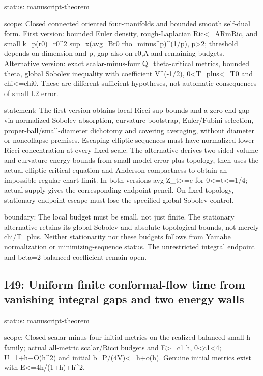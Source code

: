 \documentclass[
  10pt,
]{article}
\begin{document}
status: manuscript-theorem

scope: Closed connected oriented four-manifolds and bounded smooth
self-dual form. First version: bounded Euler density,
\textbar rough-Laplacian
Ric\textbar\textless=A\textbar Rm\textbar\textbar Ric\textbar, and small
k\_p(r0)=r0\^{}2 sup\_x(avg\_Br0 rho\_minus\^{}p)\^{}(1/p),
p\textgreater2; threshold depends on dimension and p, gap also on r0,A
and remaining budgets. Alternative version: exact scalar-minus-four
Q\_theta-critical metrics, bounded theta, global Sobolev inequality with
coefficient V\^{}(-1/2), 0\textless T\_plus\textless=T0 and
chi\textless=chi0. These are different sufficient hypotheses, not
automatic consequences of small L2 error.

statement: The first version obtains local Ricci sup bounds and a
zero-end gap via normalized Sobolev absorption, curvature bootstrap,
Euler/Fubini selection, proper-ball/small-diameter dichotomy and
covering averaging, without diameter or noncollapse premises. Escaping
elliptic sequences must have normalized lower-Ricci concentration at
every fixed scale. The alternative derives two-sided volume and
curvature-energy bounds from small model error plus topology, then uses
the actual elliptic critical equation and Anderson compactness to obtain
an impossible regular-chart limit. In both versions avg
Z\_t\textgreater=c for 0\textless=t\textless=1/4; actual supply gives
the corresponding endpoint pencil. On fixed topology, stationary
endpoint escape must lose the specified global Sobolev control.

boundary: The local budget must be small, not just finite. The
stationary alternative retains its global Sobolev and absolute
topological bounds, not merely chi/T\_plus. Neither stationarity nor
these budgets follows from Yamabe normalization or minimizing-sequence
status. The unrestricted integral endpoint and beta=2 balanced
coefficient remain open.

\hypertarget{i49-uniform-finite-conformal-flow-time-from-vanishing-integral-gaps-and-two-energy-walls}{%
\subsection{I49: Uniform finite conformal-flow time from vanishing
integral gaps and two energy
walls}\label{i49-uniform-finite-conformal-flow-time-from-vanishing-integral-gaps-and-two-energy-walls}}

status: manuscript-theorem

scope: Closed scalar-minus-four initial metrics on the realized balanced
small-h family; actual all-metric scalar/Ricci budgets and
E\textgreater=c1 h, 0\textless c1\textless4; U=1+h+O(h\^{}2) and initial
b=P/(4V)\textless=h+o(h). Genuine initial metrics exist with
E\textless=4h/(1+h)+h\^{}2.
\end{document}
